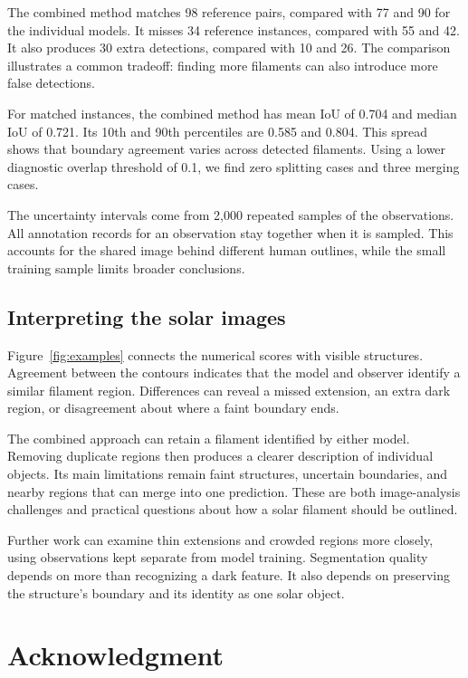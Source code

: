 \documentclass[sigconf]{acmart}
\begin{document}
The combined method matches 98 reference pairs, compared with 77 and 90 for the individual models.
It misses 34 reference instances, compared with 55 and 42. It also produces 30 extra detections, compared with 10 and 26.
The comparison illustrates a common tradeoff: finding more filaments can also introduce more false detections.


For matched instances, the combined method has mean IoU of 0.704 and median IoU of 0.721.
Its 10th and 90th percentiles are 0.585 and 0.804. This spread shows that boundary agreement varies across detected filaments.
Using a lower diagnostic overlap threshold of 0.1, we find zero splitting cases and three merging cases.


The uncertainty intervals come from 2,000 repeated samples of the observations.
All annotation records for an observation stay together when it is sampled.
This accounts for the shared image behind different human outlines, while the small training sample limits broader conclusions.




\subsection{Interpreting the solar images}
Figure~\ref{fig:examples} connects the numerical scores with visible structures.
Agreement between the contours indicates that the model and observer identify a similar filament region.
Differences can reveal a missed extension, an extra dark region, or disagreement about where a faint boundary ends.


The combined approach can retain a filament identified by either model. Removing duplicate regions then produces a clearer description of individual objects.
Its main limitations remain faint structures, uncertain boundaries, and nearby regions that can merge into one prediction.
These are both image-analysis challenges and practical questions about how a solar filament should be outlined.


Further work can examine thin extensions and crowded regions more closely, using observations kept separate from model training.
Segmentation quality depends on more than recognizing a dark feature.
It also depends on preserving the structure's boundary and its identity as one solar object.


\section{Acknowledgment}\label{sec:acknowledgment}
\end{document}
